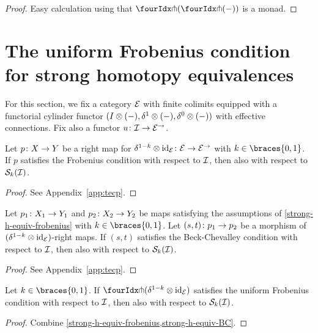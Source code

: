 \documentclass[reqno,10pt,a4paper,oneside,draft]{amsart}
\begin{document}
\begin{proof}
Easy calculation using that $\liftl{(\liftr{(-)})}$ is a monad.
\end{proof}


\section{The uniform Frobenius condition for strong homotopy equivalences}

For this section, we fix a category $\catE$ with finite colimits equipped with a functorial cylinder functor $(\interval \otimes (-), \rcyl \otimes (-), \lcyl \otimes (-))$ with effective connections.
Fix also a functor $u \co \cal{I} \to \catE^\to$.

\begin{lemma} \label{strong-h-equiv-frobenius}
Let $p \co X \to Y$ be a right map for $\kcylinv \otimes \id_{\calE} \co \catE \to \catE^\to$ with $k \in \braces{0, 1}$.
If $p$ satisfies the Frobenius condition with respect to $\cal{I}$, then also with respect to $\cal{S}_k(\cal{I})$.
\end{lemma}

\begin{proof}
See Appendix~\ref{app:tecp}.
\end{proof}

\begin{lemma} \label{strong-h-equiv-BC}
Let $p_1 \co X_1 \to Y_1$ and $p_2 \co X_2 \to Y_2$ be maps satisfying the assumptions of \cref{strong-h-equiv-frobenius} with $k \in \braces{0, 1}$.
Let $(s, t) \co p_1 \to p_2$ be a morphism of $(\kcylinv \otimes \id_\catE)$-right maps.
If $(s, t)$ satisfies the Beck-Chevalley condition with respect to $\cal{I}$, then also with respect to $\cal{S}_k(\cal{I})$.
\end{lemma}

\begin{proof}
See Appendix~\ref{app:tecp}.
\end{proof}

\begin{corollary} \label{strong-h-equiv-uniform-frobenius}
Let $k \in \braces{0, 1}$.
If $\liftr{(\kcylinv \otimes \id_\catE)}$ satisfies the uniform Frobenius condition with respect to $\cal{I}$, then also with respect to $\cal{S}_k(\cal{I})$.
\end{corollary}

\begin{proof}
Combine \cref{strong-h-equiv-frobenius,strong-h-equiv-BC}.
\end{proof}
\end{document}
